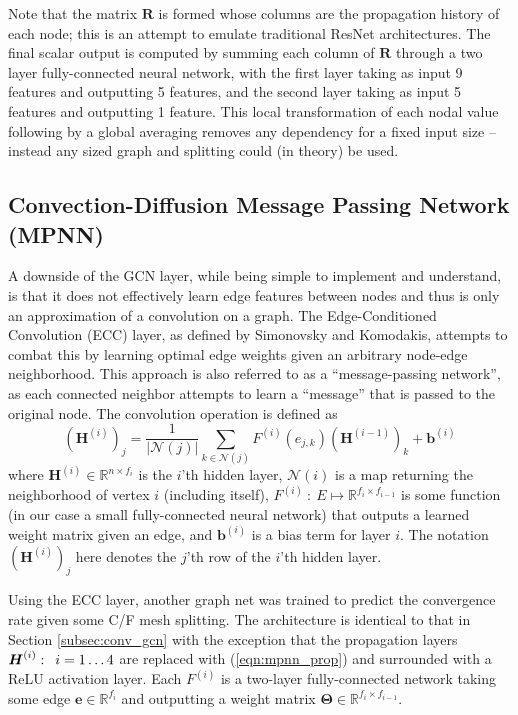 \documentclass[review]{siamart190516}
\newcommand{\abs}[1]{\left\lvert#1\right\rvert}
\newcommand{\mat}[1]{\bm{{#1}}}
\renewcommand{\vec}[1]{\bm{{#1}}}
\newcommand{\hquad}{\enskip}
\begin{document}
Note that the matrix $\mat{R}$ is formed whose columns are the propagation history of each node; this is an attempt to emulate traditional ResNet architectures.  The final scalar output is computed by summing each column of $\mat{R}$ through a two layer fully-connected neural network, with the first layer taking as input 9 features and outputting 5 features, and the second layer taking as input 5 features and outputting 1 feature.  This local transformation of each nodal value following by a global averaging removes any dependency for a fixed input size -- instead any sized graph and splitting could (in theory) be used.

\subsection{Convection-Diffusion Message Passing Network (MPNN)}\label{subsec:conv_mpnn}
A downside of the GCN layer, while being simple to implement and understand, is that it does not effectively learn edge features between nodes and thus is only an approximation of a convolution on a graph.  The Edge-Conditioned Convolution (ECC) layer, as defined by Simonovsky and Komodakis\cite{ecc}, attempts to combat this by learning optimal edge weights given an arbitrary node-edge neighborhood.  This approach is also referred to as a ``message-passing network'', as each connected neighbor attempts to learn a ``message'' that is passed to the original node.\cite{mpnn}  The convolution operation is defined as
%
\begin{equation}\label{eqn:mpnn_prop}
  \left(\mat{H}^{(i)}\right)_j = \frac{1}{\abs{\mathcal{N}\left(j\right)}} \sum_{k\in\mathcal{N}\left(j\right)} F^{(i)}\left(e_{j,k}\right)\left(\mat{H}^{(i-1)}\right)_k + \vec{b}^{(i)}
\end{equation}
%
where $\mat{H}^{\left(i\right)} \in \mathbb{R}^{n \times f_i}$ is the $i$'th hidden layer, $\mathcal{N}\left(i\right)$ is a map returning the neighborhood of vertex $i$ (including itself), $F^{(i)} \: : \: E \mapsto \mathbb{R}^{f_i \times f_{i-1}}$ is some function (in our case a small fully-connected neural network) that outputs a learned weight matrix given an edge, and $\vec{b}^{(i)}$ is a bias term for layer $i$.  The notation $\left(\mat{H}^{\left(i\right)}\right)_j$ here denotes the $j$'th row of the $i$'th hidden layer.

Using the ECC layer, another graph net was trained to predict the convergence rate given some C/F mesh splitting.  The architecture is identical to that in Section \ref{subsec:conv_gcn} with the exception that the propagation layers $\mat{H}^{(i)}: \hquad i=1\ldots 4$ are replaced with (\ref{eqn:mpnn_prop}) and surrounded with a ReLU activation layer.  Each $F^{(i)}$ is a two-layer fully-connected network taking some edge $\vec{e} \in \mathbb{R}^{f_i}$ and outputting a weight matrix $\mat{\Theta} \in \mathbb{R}^{f_i\times f_{i-1}}$.
\end{document}

